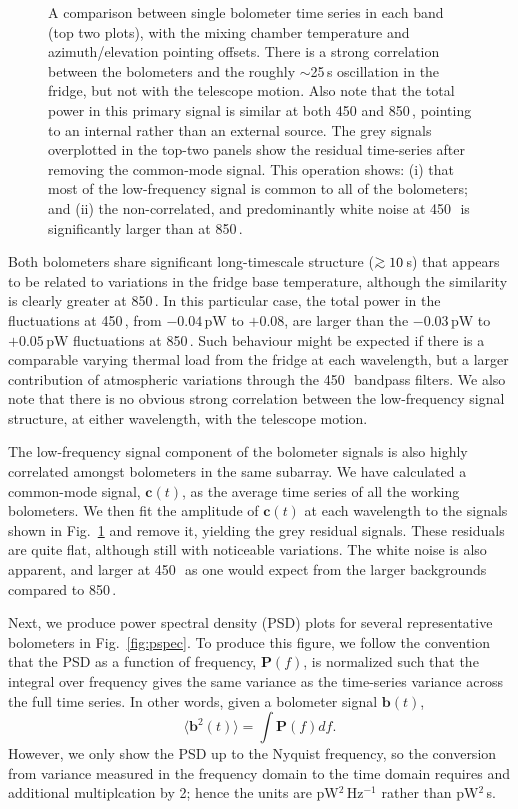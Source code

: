 \documentclass[useAMS,usenatbib,nofootinbib]{mn2e}
\def\gsim{\mathrel{\lower2.5pt\vbox{\lineskip=0pt\baselineskip=0pt
          \hbox{$>$}\hbox{$\sim$}}}}
\begin{document}
\begin{figure}
\caption{A comparison between single bolometer time series in each
  band (top two plots), with the mixing chamber temperature and
  azimuth/elevation pointing offsets. There is a strong correlation
  between the bolometers and the roughly $\sim$25\,s oscillation in
  the fridge, but not with the telescope motion. Also note that the
  total power in this primary signal is similar at both 450 and
  850\,\micron, pointing to an internal rather than an external
  source. The grey signals overplotted in the top-two panels show the
  residual time-series after removing the common-mode signal. This
  operation shows: (i) that most of the low-frequency signal is common
  to all of the bolometers; and (ii) the non-correlated, and
  predominantly white noise at 450\,\micron\ is significantly larger
  than at 850\,\micron.}
\label{fig:bolos_mix}
\end{figure}

Both bolometers share significant long-timescale structure
($\gsim10$\,s) that appears to be related to variations in the fridge
base temperature, although the similarity is clearly greater at
850\,\micron. In this particular case, the total power in the
fluctuations at 450\,\micron, from $-0.04$\,pW to $+0.08$, are larger
than the $-0.03$\,pW to $+0.05$\,pW fluctuations at 850\,\micron. Such
behaviour might be expected if there is a comparable varying thermal
load from the fridge at each wavelength, but a larger contribution of
atmospheric variations through the 450\,\micron\ bandpass filters. We
also note that there is no obvious strong correlation between the
low-frequency signal structure, at either wavelength, with the
telescope motion.

The low-frequency signal component of the bolometer signals is also
highly correlated amongst bolometers in the same subarray. We have
calculated a common-mode signal, $\mathbf{c}(t)$, as the average time
series of all the working bolometers. We then fit the amplitude of
$\mathbf{c}(t)$ at each wavelength to the signals shown in
Fig.~\ref{fig:bolos_mix} and remove it, yielding the grey residual
signals. These residuals are quite flat, although still with
noticeable variations. The white noise is also apparent, and larger at
450\,\micron\ as one would expect from the larger backgrounds compared
to 850\,\micron.

Next, we produce power spectral density (PSD) plots for several
representative bolometers in Fig.~\ref{fig:pspec}. To produce this
figure, we follow the convention that the PSD as a function of
frequency, $\mathbf{P}(f)$, is normalized such that the integral over
frequency gives the same variance as the time-series variance across
the full time series. In other words, given a bolometer signal
$\mathbf{b}(t)$,
%
\begin{equation}
\label{eq:psd}
\langle\mathbf{b}^2(t)\rangle = \int \mathbf{P}(f) df .
\end{equation}
%
However, we only show the PSD up to the Nyquist frequency, so the
conversion from variance measured in the frequency domain to the time
domain requires and additional multiplcation by 2; hence the units are
pW$^2$\,Hz$^{-1}$ rather than pW$^2$\,s.
\end{document}
